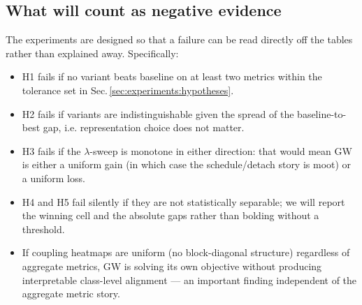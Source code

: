 \subsection*{What will count as negative evidence}
The experiments are designed so that a failure can be read
directly off the tables rather than explained away. Specifically:
\begin{itemize}[leftmargin=*,topsep=2pt]
  \item H1 fails if no variant beats baseline on at least two
    metrics within the tolerance set in
    Sec.\,\ref{sec:experiments:hypotheses}.
  \item H2 fails if variants are indistinguishable given the
    spread of the baseline-to-best gap, i.e. representation
    choice does not matter.
  \item H3 fails if the $\lambda$-sweep is monotone in either
    direction: that would mean GW is either a uniform gain (in
    which case the schedule/detach story is moot) or a uniform
    loss.
  \item H4 and H5 fail silently if they are not statistically
    separable; we will report the winning cell and the absolute
    gaps rather than bolding without a threshold.
  \item If coupling heatmaps are uniform (no block-diagonal
    structure) regardless of aggregate metrics, GW is solving its
    own objective without producing interpretable class-level
    alignment --- an important finding independent of the
    aggregate metric story.
\end{itemize}
